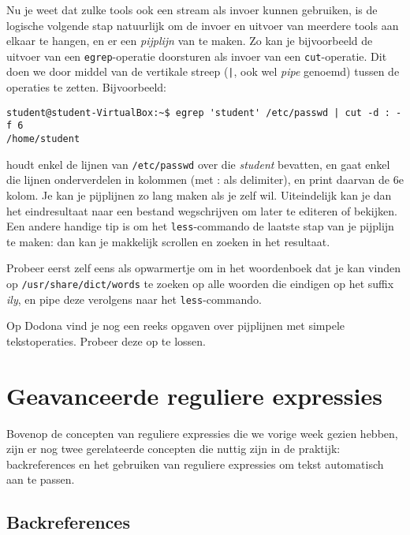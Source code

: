 \documentclass[a4paper,twoside,openany]{memoir}
\begin{document}
Nu je weet dat zulke tools ook een stream als invoer kunnen gebruiken, is de
logische volgende stap natuurlijk om de invoer en uitvoer van meerdere tools aan
elkaar te hangen, en er een \emph{pijplijn} van te maken. Zo kan je bijvoorbeeld
de uitvoer van een \verb!egrep!-operatie doorsturen als invoer van een
\verb!cut!-operatie. Dit doen we door middel van de vertikale streep (\verb!|!,
ook wel \emph{pipe} genoemd) tussen de operaties te zetten. Bijvoorbeeld:
\begin{verbatim}
student@student-VirtualBox:~$ egrep 'student' /etc/passwd | cut -d : -f 6
/home/student
\end{verbatim}

houdt enkel de lijnen van \verb!/etc/passwd! over die \emph{student} bevatten,
en gaat enkel die lijnen onderverdelen in kolommen (met : als delimiter), en
print daarvan de 6e kolom. Je kan je pijplijnen zo lang maken als je zelf wil.
Uiteindelijk kan je dan het eindresultaat naar een bestand wegschrijven om later
te editeren of bekijken. Een andere handige tip is om het \verb!less!-commando
de laatste stap van je pijplijn te maken: dan kan je makkelijk scrollen en
zoeken in het resultaat.

Probeer eerst zelf eens als opwarmertje om in het woordenboek dat je kan vinden
op \verb!/usr/share/dict/words! te zoeken op alle woorden die eindigen op het
suffix \emph{ily}, en pipe deze verolgens naar het \verb!less!-commando.

Op Dodona vind je nog een reeks opgaven over pijplijnen met simpele
tekstoperaties. Probeer deze op te lossen.

\chapter{Geavanceerde reguliere expressies}

Bovenop de concepten van reguliere expressies die we vorige week gezien hebben,
zijn er nog twee gerelateerde concepten die nuttig zijn in de praktijk:
backreferences en het gebruiken van reguliere expressies om tekst automatisch
aan te passen.

\section{Backreferences}
\end{document}
